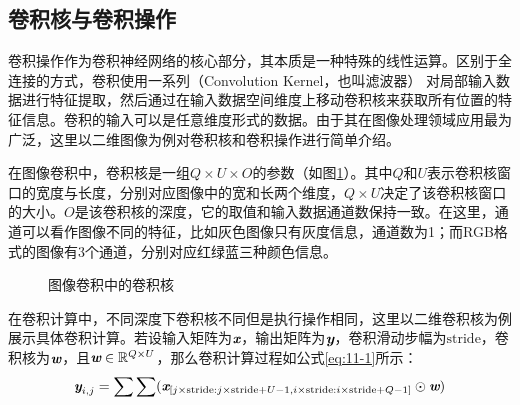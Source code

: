 \vspace{-1em}
\subsection{卷积核与卷积操作}

\parinterval 卷积操作作为卷积神经网络的核心部分，其本质是一种特殊的线性运算。区别于全连接的方式，卷积使用一系列{\small{}}（Convolution Kernel，也叫滤波器） 对局部输入数据进行特征提取，然后通过在输入数据空间维度上移动卷积核来获取所有位置的特征信息。卷积的输入可以是任意维度形式的数据。由于其在图像处理领域应用最为广泛，这里以二维图像为例对卷积核和卷积操作进行简单介绍。

\parinterval 在图像卷积中，卷积核是一组$Q \times U \times O$的参数（如图\ref{fig:11-3}）。其中$Q$和$U$表示卷积核窗口的宽度与长度，分别对应图像中的宽和长两个维度，$Q \times U$决定了该卷积核窗口的大小。$O$是该卷积核的深度，它的取值和输入数据通道数保持一致。在这里，通道可以看作图像不同的特征，比如灰色图像只有灰度信息，通道数为1；而RGB格式的图像有3个通道，分别对应红绿蓝三种颜色信息。
\vspace{-0.5em}

\begin{figure}[htp]
\centering

\caption{图像卷积中的卷积核}
\label{fig:11-3}
\end{figure}

\vspace{-0.5em}
\parinterval 在卷积计算中，不同深度下卷积核不同但是执行操作相同，这里以二维卷积核为例展示具体卷积计算。若设输入矩阵为$\textbf{\em x}$，输出矩阵为$\textbf{\em y}$，卷积滑动步幅为$\textrm{stride}$，卷积核为$\textbf{\em w}$，且$\textbf{\em w} \in \mathbb{R}^{Q \times U} $，那么卷积计算过程如公式\eqref{eq:11-1}所示：
\begin{eqnarray}
\textbf{\em y}_{i,j} = \sum \sum ( \textbf{\em x}_{[j\times \textrm{stride}:j\times \textrm{stride}+U-1,i\times \textrm{stride}:i\times \textrm{stride}+Q-1]} \odot \textbf{\em w} )
\label{eq:11-1}
\end{eqnarray}

